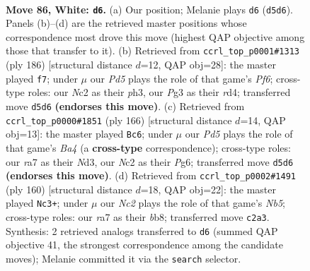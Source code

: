 \documentclass[11pt]{article}
\begin{document}
\clearpage

\begin{figure}[p]\centering
\begin{subfigure}{0.46\textwidth}\centering
\resizebox{\linewidth}{!}{%
\newchessgame
\chessboard[
  setfen={1R6/r5p1/5p2/3P3p/4k2P/6P1/2N5/7K w - - 11 86},
  showmover=false,
  pgfstyle=straightmove, color=movearrow, markmove={d5-d6}
]}
\caption{}
\end{subfigure}\hfill
\begin{subfigure}{0.46\textwidth}\centering
\resizebox{\linewidth}{!}{%
\newchessgame
\chessboard[
  setfen={7R/4K2p/5P2/p5k1/1p1r4/1P5p/P7/8 w - - 8 94},
  showmover=false,
  pgfstyle=straightmove, color=movearrow, markmove={f6-f7}
]}
\caption{}
\end{subfigure}
\\[4pt]
\begin{subfigure}{0.46\textwidth}\centering
\resizebox{\linewidth}{!}{%
\newchessgame
\chessboard[
  setfen={r7/4k3/4p1P1/3p1p2/B2P4/3NP3/6K1/8 w - - 8 84},
  showmover=false,
  pgfstyle=straightmove, color=movearrow, markmove={a4-c6}
]}
\caption{}
\end{subfigure}\hfill
\begin{subfigure}{0.46\textwidth}\centering
\resizebox{\linewidth}{!}{%
\newchessgame
\chessboard[
  setfen={1b6/6p1/2P4p/1N1k4/p5P1/5K1P/8/8 w - - 5 81},
  showmover=false,
  pgfstyle=straightmove, color=movearrow, markmove={b5-c3}
]}
\caption{}
\end{subfigure}
\caption{\textbf{Move 86, White: \texttt{d6}.} (a) Our position; Melanie plays \texttt{d6} (\texttt{d5d6}). Panels (b)--(d) are the retrieved master positions whose correspondence most drove this move (highest QAP objective among those that transfer to it). (b) Retrieved from \texttt{ccrl\_top\_p0001\#1313} (ply 186) [structural distance $d$=12, QAP obj=28]: the master played \texttt{f7}; under $\mu$ our \emph{Pd5} plays the role of that game's \emph{Pf6}; cross-type roles: our \emph{N}c2 as their \emph{p}h3, our \emph{P}g3 as their \emph{r}d4; transferred move \texttt{d5d6} \textbf{(endorses this move)}. (c) Retrieved from \texttt{ccrl\_top\_p0000\#1851} (ply 166) [structural distance $d$=14, QAP obj=13]: the master played \texttt{Bc6}; under $\mu$ our \emph{Pd5} plays the role of that game's \emph{Ba4} (a \textbf{cross-type} correspondence); cross-type roles: our \emph{r}a7 as their \emph{N}d3, our \emph{N}c2 as their \emph{P}g6; transferred move \texttt{d5d6} \textbf{(endorses this move)}. (d) Retrieved from \texttt{ccrl\_top\_p0002\#1491} (ply 160) [structural distance $d$=18, QAP obj=22]: the master played \texttt{Nc3+}; under $\mu$ our \emph{Nc2} plays the role of that game's \emph{Nb5}; cross-type roles: our \emph{r}a7 as their \emph{b}b8; transferred move \texttt{c2a3}. Synthesis: 2 retrieved analogs transferred to \texttt{d6} (summed QAP objective 41, the strongest correspondence among the candidate moves); Melanie committed it via the \texttt{search} selector.}
\label{fig:thought-m170}
\end{figure}
\end{document}
